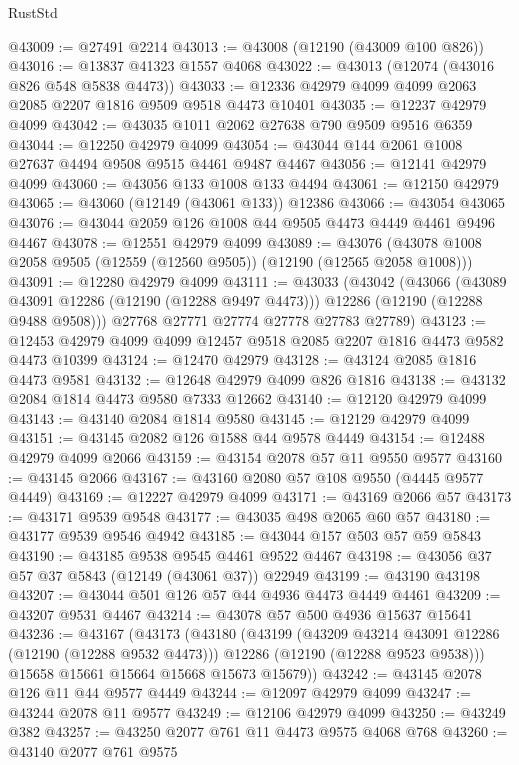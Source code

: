 \begin{lexlean}{RustStd}
\begin{coremodule}
@43009 := @27491 @2214
@43013 := @43008 (@12190 (@43009 @100 @826))
@43016 := @13837 @41323 @1557 @4068
@43022 := @43013 (@12074 (@43016 @826 @548 @5838 @4473))
@43033 := @12336 @42979 @4099 @4099 @2063 @2085 @2207 @1816 @9509 @9518 @4473 @10401
@43035 := @12237 @42979 @4099
@43042 := @43035 @1011 @2062 @27638 @790 @9509 @9516 @6359
@43044 := @12250 @42979 @4099
@43054 := @43044 @144 @2061 @1008 @27637 @4494 @9508 @9515 @4461 @9487 @4467
@43056 := @12141 @42979 @4099
@43060 := @43056 @133 @1008 @133 @4494
@43061 := @12150 @42979
@43065 := @43060 (@12149 (@43061 @133)) @12386
@43066 := @43054 @43065
@43076 := @43044 @2059 @126 @1008 @44 @9505 @4473 @4449 @4461 @9496 @4467
@43078 := @12551 @42979 @4099
@43089 := @43076 (@43078 @1008 @2058 @9505 (@12559 (@12560 @9505)) (@12190 (@12565 @2058 @1008)))
@43091 := @12280 @42979 @4099
@43111 := @43033
    (@43042
      (@43066
        (@43089 @43091 @12286 (@12190 (@12288 @9497 @4473)))
        @12286
        (@12190 (@12288 @9488 @9508)))
      @27768
      @27771
      @27774
      @27778
      @27783
      @27789)
@43123 := @12453 @42979 @4099 @4099 @12457 @9518 @2085 @2207 @1816 @4473 @9582 @4473 @10399
@43124 := @12470 @42979
@43128 := @43124 @2085 @1816 @4473 @9581
@43132 := @12648 @42979 @4099 @826 @1816
@43138 := @43132 @2084 @1814 @4473 @9580 @7333 @12662
@43140 := @12120 @42979 @4099
@43143 := @43140 @2084 @1814 @9580
@43145 := @12129 @42979 @4099
@43151 := @43145 @2082 @126 @1588 @44 @9578 @4449
@43154 := @12488 @42979 @4099 @2066
@43159 := @43154 @2078 @57 @11 @9550 @9577
@43160 := @43145 @2066
@43167 := @43160 @2080 @57 @108 @9550 (@4445 @9577 @4449)
@43169 := @12227 @42979 @4099
@43171 := @43169 @2066 @57
@43173 := @43171 @9539 @9548
@43177 := @43035 @498 @2065 @60 @57
@43180 := @43177 @9539 @9546 @4942
@43185 := @43044 @157 @503 @57 @59 @5843
@43190 := @43185 @9538 @9545 @4461 @9522 @4467
@43198 := @43056 @37 @57 @37 @5843 (@12149 (@43061 @37)) @22949
@43199 := @43190 @43198
@43207 := @43044 @501 @126 @57 @44 @4936 @4473 @4449 @4461
@43209 := @43207 @9531 @4467
@43214 := @43078 @57 @500 @4936 @15637 @15641
@43236 := @43167
    (@43173
      (@43180
        (@43199
          (@43209 @43214 @43091 @12286 (@12190 (@12288 @9532 @4473)))
          @12286
          (@12190 (@12288 @9523 @9538)))
        @15658
        @15661
        @15664
        @15668
        @15673
        @15679))
@43242 := @43145 @2078 @126 @11 @44 @9577 @4449
@43244 := @12097 @42979 @4099
@43247 := @43244 @2078 @11 @9577
@43249 := @12106 @42979 @4099
@43250 := @43249 @382
@43257 := @43250 @2077 @761 @11 @4473 @9575 @4068 @768
@43260 := @43140 @2077 @761 @9575

\end{coremodule}
\end{lexlean}
